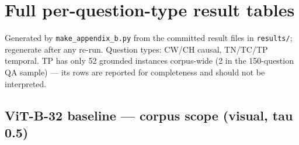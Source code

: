 \chapter{Full per-question-type result
tables}

Generated by \texttt{make\_appendix\_b.py} from the committed result
files in \texttt{results/}; regenerate after any re-run. Question types:
CW/CH causal, TN/TC/TP temporal. TP has only 52 grounded instances
corpus-wide (2 in the 150-question QA sample) --- its rows are reported
for completeness and should not be interpreted.

\section{ViT-B-32 baseline --- corpus scope (visual, tau
0.5)}

